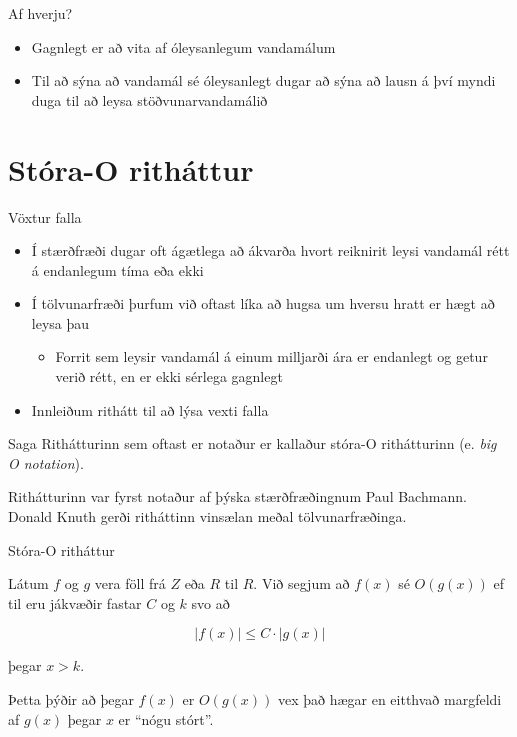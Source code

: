\documentclass{beamer}
\begin{document}
\begin{frame}{Af hverju?}
    \begin{itemize}
        \item Gagnlegt er að vita af óleysanlegum vandamálum
        \item Til að sýna að vandamál sé óleysanlegt dugar að sýna að lausn á því myndi duga til að leysa stöðvunarvandamálið
    \end{itemize}
\end{frame}

\section{Stóra-O ritháttur}

\begin{frame}{Vöxtur falla}
\begin{itemize}
 \item Í stærðfræði dugar oft ágætlega að ákvarða hvort reiknirit leysi vandamál rétt á endanlegum tíma eða ekki
 \item Í tölvunarfræði þurfum við oftast líka að hugsa um hversu hratt er hægt að leysa þau
 \begin{itemize}
  \item Forrit sem leysir vandamál á einum milljarði ára er endanlegt og getur verið rétt, en er ekki sérlega gagnlegt
 \end{itemize}
 \item Innleiðum rithátt til að lýsa vexti falla
\end{itemize}
\end{frame}

\begin{frame}{Saga}
Rithátturinn sem oftast er notaður er kallaður stóra-O rithátturinn (e. \emph{big O notation}).

Rithátturinn var fyrst notaður af þýska stærðfræðingnum Paul Bachmann. Donald Knuth gerði ritháttinn vinsælan meðal tölvunarfræðinga.
\end{frame}

\begin{frame}{Stóra-O ritháttur}
\begin{tcolorbox}[title=Stóra O ritháttur]
Látum $f$ og $g$ vera föll frá $Z$ eða $R$ til $R$. Við segjum að $f(x)$ sé $O(g(x))$ ef til eru jákvæðir fastar $C$ og $k$ svo að

\[
 |f(x)| \leq C \cdot |g(x)|
\]

þegar $x > k$.
\end{tcolorbox}
Þetta þýðir að þegar $f(x)$ er $O(g(x))$ vex það hægar en eitthvað margfeldi af $g(x)$ þegar $x$ er ``nógu stórt''.
\end{frame}
\end{document}

